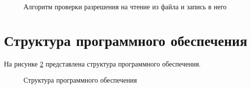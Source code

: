 \begin{figure}[ph!]
	\caption{Алгоритм проверки разрешения на чтение из файла и запись в него}
	\label{fig:readwrite}
\end{figure}

\clearpage

\section{Структура программного обеспечения}

На рисунке \ref{fig:struct} представлена структура программного обеспечения.

\begin{figure}[ph!]
	\caption{Структура программного обеспечения}
	\label{fig:struct}
\end{figure}



